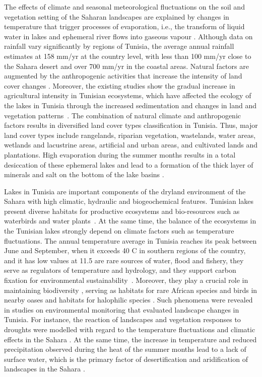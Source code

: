 \documentclass[land,article,accept,pdftex,moreauthors]{Definitions/mdpi}
\begin{document}
The effects of climate and seasonal meteorological fluctuations on the soil and vegetation setting of the Saharan landscapes are explained by changes in temperature that trigger processes of evaporation, i.e., the transform of liquid water in lakes and ephemeral river flows into gaseous vapour \cite{HAMMI2003215}. {Although data on rainfall vary significantly by regions of Tunisia, the average annual rainfall estimates at 158 mm/yr at the country level, with less than 100 mm/yr close to the Sahara desert and over 700 mm/yr in the coastal areas. }Natural factors are augmented by the anthropogenic activities that increase the intensity of land cover changes \cite{RODRIGUEZCABALLERO2017146}. {Moreover, the existing studies show the gradual increase in agricultural intensity in Tunisian ecosystems, which have affected the ecology of the lakes in Tunisia through the increased sedimentation and changes in land and vegetation patterns}~\cite{STEVENSON1991275}. {The combination of natural climate and anthropogenic factors results in diversified land cover types classification in Tunisia. Thus, major land cover types include rangelands, riparian vegetation, wastelands, water areas, wetlands and lacustrine areas, artificial and urban areas, and cultivated lands and plantations. }High evaporation during the summer months results in a total desiccation of these ephemeral lakes and lead to a formation of the thick layer of minerals and salt on the bottom of the lake basins \cite{BRYANT1994269}. 

Lakes in Tunisia are important components of the dryland environment of the Sahara{ with high climatic, hydraulic and biogeochemical features. Tunisian lakes present diverse habitats for productive ecosystems and bio-resources such as waterbirds and water plants}~\cite{SAHBANI2022102288}. {At the same time, the balance of the ecosystems in the Tunisian lakes strongly depend on climate factors such as  temperature fluctuations. The annual temperature average in Tunisia reaches its peak between June and September, when it exceeds} 40 \degree C{ in southern regions of the country, and it has low values at 11.5}  are rare sources of water, flood and fishery, they serve as regulators of temperature and hydrology, and they support carbon fixation for environmental sustainability~\cite{NIGAM2020201}. Moreover, they play a crucial role in maintaining biodiversity \cite{Neji}, serving as habitats for rare African species and birds in nearby oases \cite{Baduel,RADDADI2022104806,Kamel} and habitats for halophilic species \cite{NEIFAR20191802}. Such phenomena were revealed in studies on environmental monitoring that evaluated landscape changes in Tunisia. For instance, the reaction of landscapes and vegetation responses to droughts were modelled with regard to the temperature fluctuations and climatic effects in the Sahara \cite{HANAFI2008557,PAUSATA2020235,Lemenkova202313}. At the same time, the increase in temperature and reduced precipitation observed during the heat of the summer months lead to a lack of surface water, which is the primary factor of desertification and aridification of landscapes in the Sahara \cite{OSWALD2023369,DODORICO2013326}. 
\end{document}
